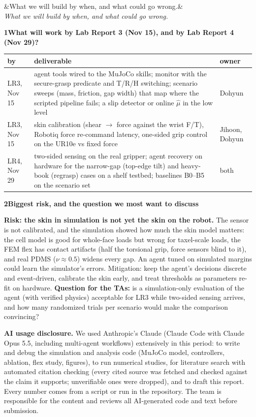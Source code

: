 \documentclass[10pt]{article}
\newcommand{\tplsec}[3]{\par\vspace{7pt}\noindent\colorbox{tplband}{\parbox{\dimexpr\linewidth-2\fboxsep}{%
  \vspace{2pt}{\color{tplorange}\large\bfseries #1}\hspace{0.5em}{\large\bfseries #2}%
  \ifx&#3&\else\\[-1pt]{\small\itshape\color{ink2}#3}\fi\vspace{2pt}}}\par\vspace{3pt}}
\newcommand{\tplq}[2]{\par\vspace{3pt}\noindent\colorbox{tplrow}{\parbox{\dimexpr\linewidth-2\fboxsep}{%
  {\color{tplorange}\bfseries #1}\hspace{0.45em}\textbf{#2}}}\par\vspace{1pt}}
\begin{document}
\tplsec{E}{Plan and risks}{What we will build by when, and what could go wrong.}
\tplq{1}{What will work by Lab Report 3 (Nov 15), and by Lab Report 4 (Nov 29)?}
{\footnotesize\setlength{\tabcolsep}{4pt}
\begin{tabularx}{\linewidth}{@{}L{1.55cm}XL{2.2cm}@{}}\toprule
by & deliverable & owner\\\midrule
LR3, Nov 15 & agent tools wired to the MuJoCo skills; monitor with the secure-grasp predicate and T/R/H switching;
scenario sweeps (mass, friction, gap width) that map where the scripted pipeline fails; a slip detector or online
$\hat\mu$ in the low level & Dohyun\\
LR3, Nov 15 & skin calibration (shear $\to$ force against the wrist F/T), Robotiq force re-command latency, one-sided
grip control on the UR10e vs fixed force & Jihoon, Dohyun\\
LR4, Nov 29 & two-sided sensing on the real gripper; agent recovery on hardware for the narrow-gap (top-edge tilt) and
heavy-book (regrasp) cases on a shelf testbed; baselines B0--B5 on the scenario set & both\\\bottomrule
\end{tabularx}}

\tplq{2}{Biggest risk, and the question we most want to discuss}
\textbf{Risk: the skin in simulation is not yet the skin on the robot.} The sensor is not calibrated, and the simulation
showed how much the skin model matters: the cell model is good for whole-face loads but wrong for taxel-scale loads,
the FEM flex has contact artifacts (half the torsional grip, force sensors blind to it), and real PDMS ($\nu\approx0.5$)
widens every gap. An agent tuned on simulated margins could learn the simulator's errors. Mitigation: keep the agent's
decisions discrete and event-driven, calibrate the skin early, and treat thresholds as parameters re-fit on hardware.
\textbf{Question for the TAs:} is a simulation-only evaluation of the agent (with verified physics) acceptable for LR3
while two-sided sensing arrives, and how many randomized trials per scenario would make the comparison convincing?

\par\vspace{6pt}\noindent\colorbox{tplrow}{\parbox{\dimexpr\linewidth-2\fboxsep}{\footnotesize
\textbf{\color{tplorange}AI usage disclosure.} We used Anthropic's Claude (Claude Code with Claude Opus 5.5, including
multi-agent workflows) extensively in this period: to write and debug the simulation and analysis code (MuJoCo model,
controllers, ablation, flex study, figures), to run numerical studies, for literature search with automated citation
checking (every cited source was fetched and checked against the claim it supports; unverifiable ones were dropped),
and to draft this report. Every number comes from a script or run in the repository. The team is responsible for the
content and reviews all AI-generated code and text before submission.}}
\end{document}
